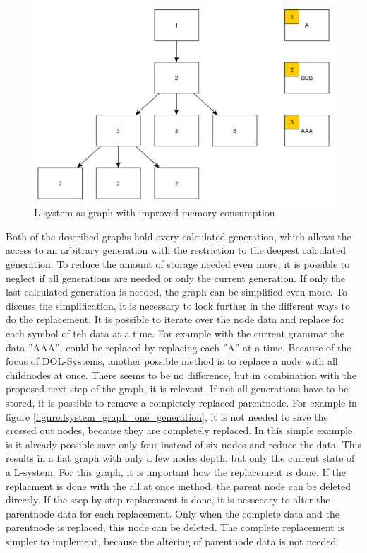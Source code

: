 \documentclass[english]{cpp-hmwk}
\begin{document}
\begin{figure}[h!]
	\centering
	\includegraphics[width=0.8\columnwidth]{../graphs/LSystem/examples/lsystem_graph_reduced_example.png}
	\caption{L-system as graph with improved memory consumption}
	\label{figure:lsystem_graph_mem_reduction}
\end{figure}

\medskip
\noindent Both of the described graphs hold every calculated generation, which allows the access to an arbitrary generation with the restriction to the deepest calculated generation. To reduce the amount of storage needed even more, it is possible to neglect if all generations are needed or only the current generation. If only the last calculated generation is needed, the graph can be simplified even more. To discuss the simplification, it is necessary to look further in the different ways to do the replacement. It  is possible to iterate over the node data and replace for each symbol of teh data at a time. For example with the current grammar the data ''AAA'', could be replaced by replacing each ''A'' at a time. Because of the focus of DOL-Systems, another possible method is to replace a node with all childnodes at once.\newline
There seems to be no difference, but in combination with the proposed next step of the graph, it is relevant. If not all generations have to be stored, it is possible to remove a completely replaced parentnode. For example in figure \ref{figure:lsystem_graph_one_generation}, it is not needed to save the crossed out nodes, because they are completely replaced. In this simple example is it already possible save only four instead of six nodes and reduce the data. This results in a flat graph with only a few nodes depth, but only the current state of a L-system. For this graph, it is  important how the replacement is done. If the replacment is done with the all at once method, the parent node can be deleted directly. If the step by step replacement is done, it is nessecary to alter the parentnode data for each replacement. Only when the complete data and the parentnode is replaced, this node can be deleted. The complete replacement is simpler to implement, because the altering of parentnode data is not needed.
\end{document}
